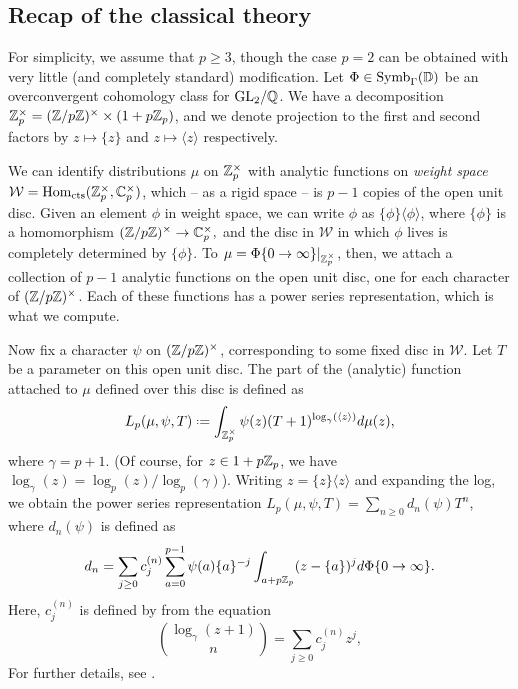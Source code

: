 \documentclass[a4paper,10pt]{article}
\newcommand{\W}{\mathcal{W}}
\numberwithin{equation}{section}
\begin{document}
\subsection{Recap of the classical theory}

For simplicity, we assume that $p \geq 3$, though the case $p = 2$ can be obtained with very little (and completely standard) modification. Let $\Phi \in \mathrm{Symb}_\Gamma(\mathbb{D})$ be an overconvergent cohomology class for $\mathrm{GL}_2/\mathbb{Q}$. We have a decomposition $\mathbb{Z}_p^\times = (\mathbb{Z}/p\mathbb{Z})^\times \times (1+p\mathbb{Z}_p)$, and we denote projection to the first and second factors by $z \mapsto \{z\}$ and $z \mapsto \langle z\rangle$ respectively. 

We can identify distributions $\mu$ on $\mathbb{Z}_p^\times$ with analytic functions on \emph{weight space} $\W = \mathrm{Hom}_{\mathrm{cts}}(\Zp^\times, \C_p^\times)$, which -- as a rigid space -- is $p-1$ copies of the open unit disc. Given an element $\phi$ in weight space, we can write $\phi$ as $\{\phi\}\langle\phi\rangle$, where $\{\phi\}$ is a homomorphism $(\mathbb{Z}/p\mathbb{Z})^\times \rightarrow \mathbb{C}_p^\times,$ and the disc in $\W$ in which $\phi$ lives is completely determined by $\{\phi\}$. To $\mu = \Phi\{0\rightarrow\infty\}|_{\mathbb{Z}_p^\times}$, then, we attach a collection of $p-1$ analytic functions on the open unit disc, one for each character of $(\mathbb{Z}/p\mathbb{Z})^\times$. Each of these functions has a power series representation, which is what we compute.

Now fix a character $\psi$ on $(\mathbb{Z}/p\mathbb{Z})^\times$, corresponding to some fixed disc in $\W$. Let $T$ be a parameter on this open unit disc.  The part of the (analytic) function attached to $\mu$ defined over this disc is defined as
\[
	L_p(\mu, \psi, T) \defeq \int_{\Zp^\times} \psi(z)(T+1)^{\log_{\gamma}(\langle z\rangle)} d\mu(z),
\]
 where $\gamma=p+1$. (Of course, for $z \in 1 + p\mathbb{Z}_p$, we have $\log_\gamma(z) = \log_p(z) / \log_p(\gamma)$). Writing $z = \{z\}\langle z\rangle$ and expanding the log, we obtain the power series representation $L_p(\mu,\psi,T) = \sum_{n\geq 0} d_n(\psi)T^n$, where $d_n(\psi)$ is defined as
\[
  d_n=\sum_{j\geq 0} c_j^{(n)} \sum_{a=0}^{p-1}\psi(a) \{a\}^{-j} \int_{a+p\mathbb{Z}_p} (z-\{a\})^j d\Phi\{0\to\infty\}.
\]
Here, $c_j^{(n)}$ is defined by from the equation
\[
  \binom{\log_{\gamma}(z+1)}{n} = \sum_{j\geq 0} c_j^{(n)} z^j,
  \]
For further details, see \cite[\S9]{PS11}.

\end{document}
